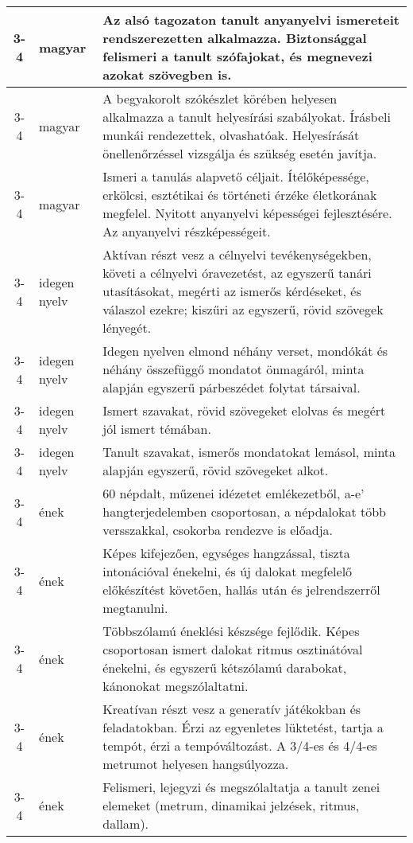 \begin{small}
\begin{longtable}{c | p{2cm} |  p{11cm} }
              3-4 & magyar & Az alsó tagozaton tanult anyanyelvi ismereteit rendszerezetten alkalmazza. Biztonsággal felismeri a tanult szófajokat, és megnevezi azokat szövegben is. \\ \hline
              3-4 & magyar & A begyakorolt szókészlet körében helyesen alkalmazza a tanult helyesírási szabályokat. Írásbeli munkái rendezettek, olvashatóak. Helyesírását önellenőrzéssel vizsgálja és szükség esetén javítja. \\ \hline
              3-4 & magyar & Ismeri a tanulás alapvető céljait. Ítélőképessége, erkölcsi, esztétikai és történeti érzéke életkorának megfelel. Nyitott anyanyelvi képességei fejlesztésére. Az anyanyelvi részképességeit. \\ \hline
              3-4 & idegen nyelv & Aktívan részt vesz a célnyelvi tevékenységekben, követi a célnyelvi óravezetést, az egyszerű tanári utasításokat, megérti az ismerős kérdéseket, és válaszol ezekre; kiszűri az egyszerű, rövid szövegek lényegét. \\ \hline
              3-4 & idegen nyelv & Idegen nyelven elmond néhány verset, mondókát és néhány összefüggő mondatot önmagáról, minta alapján egyszerű párbeszédet folytat társaival. \\ \hline
              3-4 & idegen nyelv & Ismert szavakat, rövid szövegeket elolvas és megért jól ismert témában. \\ \hline
              3-4 & idegen nyelv & Tanult szavakat, ismerős mondatokat lemásol, minta alapján egyszerű, rövid szövegeket alkot. \\ \hline
              3-4 & ének & 60 népdalt, műzenei idézetet emlékezetből, a-e’ hangterjedelemben csoportosan, a népdalokat több versszakkal, csokorba rendezve is előadja. \\ \hline
              3-4 & ének & Képes kifejezően, egységes hangzással, tiszta intonációval énekelni, és új dalokat megfelelő előkészítést követően, hallás után és jelrendszerről megtanulni. \\ \hline
              3-4 & ének & Többszólamú éneklési készsége fejlődik. Képes csoportosan ismert dalokat ritmus osztinátóval énekelni, és egyszerű kétszólamú darabokat, kánonokat megszólaltatni. \\ \hline
              3-4 & ének & Kreatívan részt vesz a generatív játékokban és feladatokban. Érzi az egyenletes lüktetést, tartja a tempót, érzi a tempóváltozást. A 3/4-es és 4/4-es metrumot helyesen hangsúlyozza. \\ \hline
              3-4 & ének & Felismeri, lejegyzi és megszólaltatja a tanult zenei elemeket (metrum, dinamikai jelzések, ritmus, dallam). \\ \hline

\end{longtable}
\end{small}
